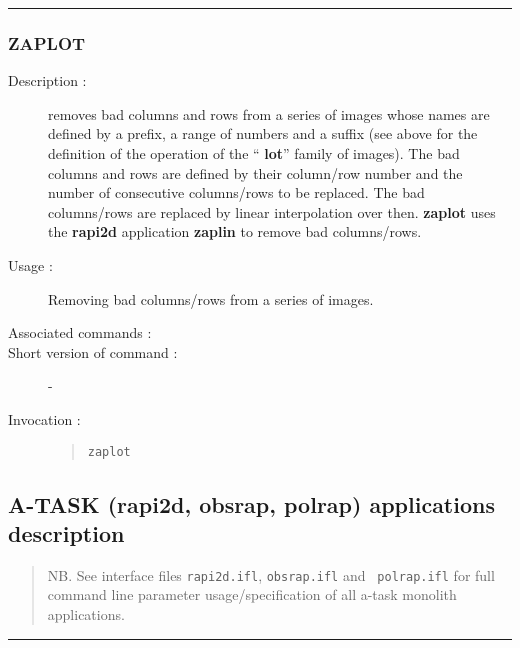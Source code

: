 \hrule
\subsubsection*{\label{ZAPLOT}ZAPLOT}

\begin{description}

\item[Description :] removes bad columns and rows from a series of
images whose names are defined by a prefix, a range of numbers and a
suffix (see above for the definition of the operation of the ``{\bf
lot}'' family of images).  The bad columns and rows are defined by
their column/row number and the number of consecutive columns/rows to
be replaced.  The bad columns/rows are replaced by linear interpolation
over then.  {\bf zaplot} uses the {\bf rapi2d} application {\bf zaplin}
to remove bad columns/rows.

\item[Usage :] Removing bad columns/rows from a series of images.
\item[Associated commands :] {\tt {}}
\item[Short version of command :] -
\item[Invocation :]

\begin{quote}{\tt  zaplot }\end{quote}

\end{description}


\newpage
\subsection{\label{ss:atask_descriptions}A-TASK (rapi2d, obsrap, polrap) applications description}

\begin{quote}
NB. See interface files {\tt rapi2d.ifl}, {\tt obsrap.ifl} and {\tt
polrap.ifl} for full command line parameter usage/specification of all
a-task monolith applications.
\end{quote}

\hrule
